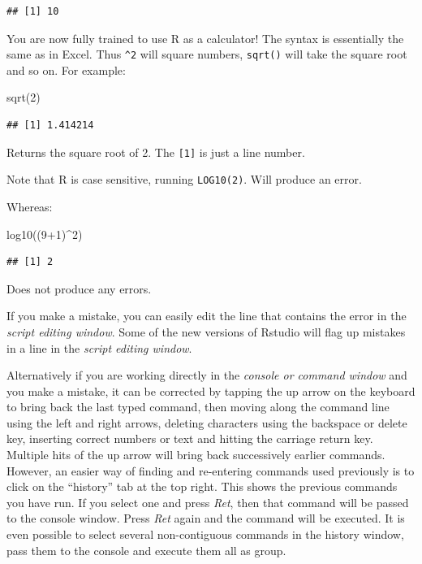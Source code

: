 \documentclass[
]{book}
\newenvironment{Shaded}{\begin{snugshade}}{\end{snugshade}}
\newcommand{\DecValTok}[1]{\textcolor[rgb]{0.00,0.00,0.81}{#1}}
\newcommand{\FunctionTok}[1]{\textcolor[rgb]{0.00,0.00,0.00}{#1}}
\newcommand{\NormalTok}[1]{#1}
\newcommand{\SpecialCharTok}[1]{\textcolor[rgb]{0.00,0.00,0.00}{#1}}
\begin{document}
\begin{verbatim}
## [1] 10
\end{verbatim}

You are now fully trained to use R as a calculator! The syntax is essentially the same as in Excel. Thus \texttt{\^{}2} will square numbers, \texttt{sqrt()} will take the square root and so on. For example:

\begin{Shaded}
\begin{Highlighting}[]
\FunctionTok{sqrt}\NormalTok{(}\DecValTok{2}\NormalTok{)}
\end{Highlighting}
\end{Shaded}

\begin{verbatim}
## [1] 1.414214
\end{verbatim}

Returns the square root of 2. The \texttt{{[}1{]}} is just a line number.

Note that R is case sensitive, running \texttt{LOG10(2)}. Will produce an error.

Whereas:

\begin{Shaded}
\begin{Highlighting}[]
\FunctionTok{log10}\NormalTok{((}\DecValTok{9}\SpecialCharTok{+}\DecValTok{1}\NormalTok{)}\SpecialCharTok{\^{}}\DecValTok{2}\NormalTok{)}
\end{Highlighting}
\end{Shaded}

\begin{verbatim}
## [1] 2
\end{verbatim}

Does not produce any errors.

If you make a mistake, you can easily edit the line that contains the error in the \emph{script editing window}. Some of the new versions of Rstudio will flag up mistakes in a line in the \emph{script editing window}.

Alternatively if you are working directly in the \emph{console or command window} and you make a mistake, it can be corrected by tapping the up arrow on the keyboard to bring back the last typed command, then moving along the command line using the left and right arrows, deleting characters using the backspace or delete key, inserting correct numbers or text and hitting the carriage return key. Multiple hits of the up arrow will bring back successively earlier commands. However, an easier way of finding and re-entering commands used previously is to click on the ``history'' tab at the top right. This shows the previous commands you have run. If you select one and press \emph{Ret}, then that command will be passed to the console window. Press \emph{Ret} again and the command will be executed. It is even possible to select several non-contiguous commands in the history window, pass them to the console and execute them all as group.
\end{document}
